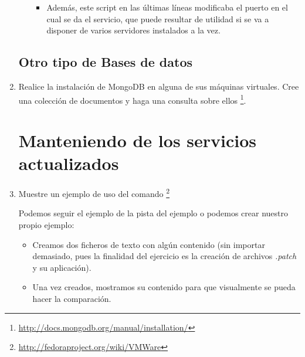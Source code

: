 \documentclass[paper=a4, fontsize=11pt]{scrartcl} %
\numberwithin{equation}{section} %
\numberwithin{figure}{section} %
\numberwithin{table}{section} %
\begin{document}
\begin{enumerate}
\begin{itemize}
\begin{itemize}
				\item Además, este script en las últimas líneas modificaba el puerto en el cual se da
				el servicio, que puede resultar de utilidad si se va a disponer de varios servidores
				instalados a la vez.
			\end{itemize}
		\end{itemize}
	
	\subsection{Otro tipo de Bases de datos}
		\item Realice la instalación de MongoDB en alguna de sus máquinas virtuales. Cree una colección
		de documentos y haga una consulta sobre ellos
		\footnote{\url{http://docs.mongodb.org/manual/installation/}}.
	
	\section{Manteniendo de los servicios actualizados}
		\item Muestre un ejemplo de uso del comando \footnote{\url{http://fedoraproject.org/wiki/VMWare}}
		
		Podemos seguir el ejemplo de la pista del ejemplo o podemos crear nuestro propio ejemplo:
		
		\begin{itemize}
			\item Creamos dos ficheros de texto con algún contenido (sin importar demasiado, pues la
			finalidad del ejercicio es la creación de archivos \textit{.patch} y su aplicación).
			
			\item Una vez creados, mostramos su contenido para que visualmente se pueda hacer la
			comparación.
			

\end{itemize}
\end{enumerate}
\end{document}
